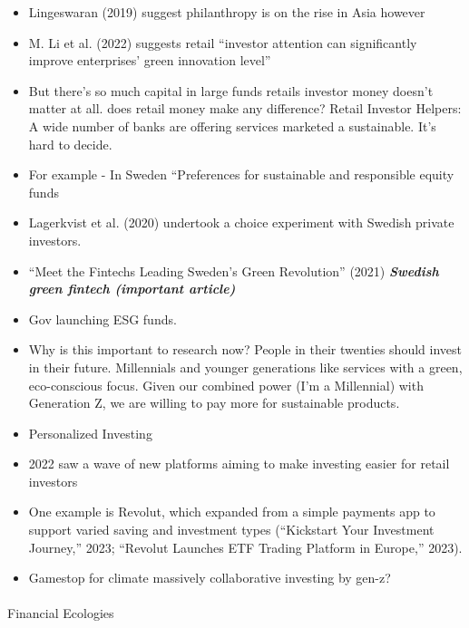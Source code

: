 \documentclass[
  letterpaper,
  DIV=11,
  numbers=noendperiod]{scrartcl}
\makeatletter
\let\oldparagraph\paragraph
\renewcommand{\paragraph}{
    \@ifstar
      \xxxParagraphStar
      \xxxParagraphNoStar
  }
\newcommand{\xxxParagraphStar}[1]{\oldparagraph*{#1}\mbox{}}
\newcommand{\xxxParagraphNoStar}[1]{\oldparagraph{#1}\mbox{}}
\makeatother
\begin{document}
\begin{itemize}
\item
  Lingeswaran (2019) suggest philanthropy is on the rise in Asia however
\item
  M. Li et al. (2022) suggests retail ``investor attention can
  significantly improve enterprises' green innovation level''
\item
  But there's so much capital in large funds retails investor money
  doesn't matter at all. does retail money make any difference? Retail
  Investor Helpers: A wide number of banks are offering services
  marketed a sustainable. It's hard to decide.
\item
  For example - In Sweden ``Preferences for sustainable and responsible
  equity funds
\item
  Lagerkvist et al. (2020) undertook a choice experiment with Swedish
  private investors.
\item
  {``Meet the Fintechs Leading {Sweden}'s Green Revolution''} (2021)
  \textbf{\emph{Swedish green fintech (important article)}}
\item
  Gov launching ESG funds.
\item
  Why is this important to research now? People in their twenties should
  invest in their future. Millennials and younger generations like
  services with a green, eco-conscious focus. Given our combined power
  (I'm a Millennial) with Generation Z, we are willing to pay more for
  sustainable products.
\item
  Personalized Investing
\item
  2022 saw a wave of new platforms aiming to make investing easier for
  retail investors
\item
  One example is Revolut, which expanded from a simple payments app to
  support varied saving and investment types ({``Kickstart Your
  Investment Journey,''} 2023; {``Revolut Launches {ETF} Trading
  Platform in {Europe},''} 2023).
\item
  Gamestop for climate massively collaborative investing by gen-z?
\end{itemize}

\paragraph{Financial Ecologies}\label{financial-ecologies}
\end{document}
